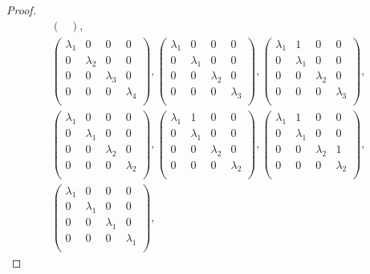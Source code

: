 \documentclass{article}
\begin{document}
\begin{proof}
\begin{align*}
\begin{pmatrix}
        \end{pmatrix},\\
      \begin{pmatrix} \lambda_1&0&0&0\\ 0&\lambda_2&0&0\\
        0&0&\lambda_3&0\\ 0&0&0&\lambda_4\\ \end{pmatrix},
        \begin{pmatrix} \lambda_1&0&0&0\\ 0&\lambda_1&0&0\\
          0&0&\lambda_2&0\\ 0&0&0&\lambda_3\\ \end{pmatrix},
        \begin{pmatrix} \lambda_1&1&0&0\\ 0&\lambda_1&0&0\\
          0&0&\lambda_2&0\\ 0&0&0&\lambda_3\\ \end{pmatrix},\\
        \begin{pmatrix} \lambda_1&0&0&0\\ 0&\lambda_1&0&0\\
          0&0&\lambda_2&0\\ 0&0&0&\lambda_2\\ \end{pmatrix},
        \begin{pmatrix} \lambda_1&1&0&0\\ 0&\lambda_1&0&0\\
          0&0&\lambda_2&0\\ 0&0&0&\lambda_2\\ \end{pmatrix},
        \begin{pmatrix} \lambda_1&1&0&0\\ 0&\lambda_1&0&0\\
          0&0&\lambda_2&1\\ 0&0&0&\lambda_2\\ \end{pmatrix},\\
        \begin{pmatrix} \lambda_1&0&0&0\\ 0&\lambda_1&0&0\\
          0&0&\lambda_1&0\\ 0&0&0&\lambda_1\\ \end{pmatrix},

\end{align*}
\end{proof}
\end{document}
